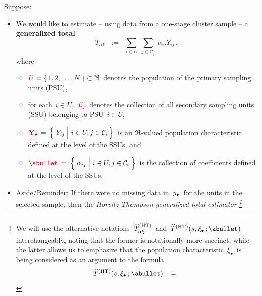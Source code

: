 Suppose:
\begin{itemize}
\item
    We would like to estimate
    -- using data from a one-stage cluster sample --
    a \textbf{generalized total}
    \begin{equation*}
    T_{\alpha Y}
    \;\; := \;\;
        \underset{i \in U}{\sum}\;
        \underset{j \in \mathcal{C}_{j}}{\sum}\;
        \alpha_{ij}Y_{ij}\,,
    \end{equation*}
    where
    \begin{itemize}
    \item
        ${\color{red}U} = \{\,1,2,\ldots,N\,\} \subset \mathbb{N}$\,
        denotes the population of the primary sampling units (PSU),
    \item
        for each \,$i \in U$,\,
        \,${\color{red}\mathcal{C}_{j}}$\,
        denotes the collection of all secondary sampling units (SSU) belonging to PSU \,$i \in U$,
    \item
        $
        {\color{red}\Ydot} \, = \, \left\{\,
            \left.
            \overset{{\color{white}.}}{Y_{ij}}
            \,\right\vert\,
            i \in U, j \in \mathcal{C}_{i}
            \,\right\}
        $\,
        is an $\Re$-valued population characteristic defined at the level of the SSUs, and
    \item
        $
        {\color{red}\abullet} \, = \, \left\{\,
            \left.
            \overset{{\color{white}1}}{\alpha_{ij}}
            \;\right\vert\,
            i \in U, j \in \mathcal{C}_{i}
            \,\right\}
        $\,
        is the collection of coefficients defined at the level of the SSUs.
    \end{itemize}
\item
    Aside/Reminder:
    \vskip 0.01cm
    \noindent
    If there were no missing data in \,$y_{\bullet}$\, for the units in the selected sample,
    then the \textit{Horvitz-Thompson generalized total estimator\! \footnote{
        We will use the alternative notations
        \,$\widehat{T}_{\alpha\xi}^{\textnormal{(HT)}}$\,
        and
        \,$\widehat{T}^{\textnormal{(HT)}}(s,\xi_{\bullet}\,;\abullet)$\,
        interchangeably, noting that the former is notationally more succinct,
        while the latter allows us to emphasize that the population characteristic
        \,$\xi_{\bullet}$\,
        is being considered as an argument to the formula
        \begin{equation*}
        \widehat{T}^{\textnormal{(HT)}}(s,\xi_{\bullet}\,;\abullet)
        \;\; := \;\;

\end{equation*}}}
\end{itemize}
